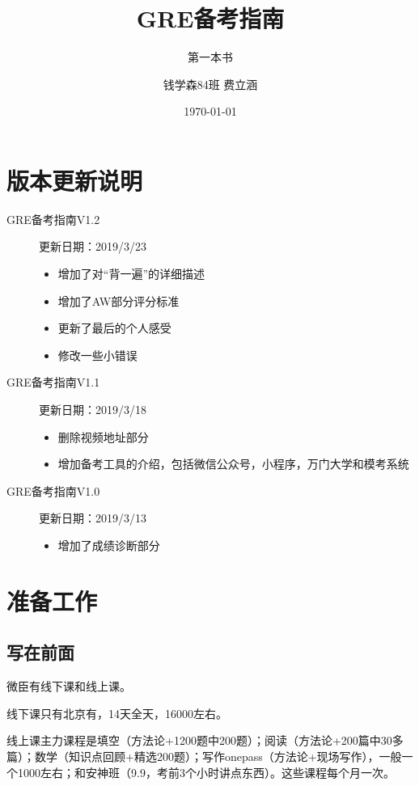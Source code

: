 \documentclass[cn,plain]{./src/qyxfbook}
\title{GRE备考指南}
\subtitle{第一本书}
\author{钱学森84班 费立涵}
\institute{钱学森学院学业辅导中心}
\date{\today}
\begin{document}
\maketitle

\chapter*{版本更新说明}
\begin{description}
    \item[GRE备考指南V1.2] 更新日期：2019/3/23
    \begin{itemize}
        \item 增加了对``背一遍''的详细描述
        \item 增加了AW部分评分标准
        \item 更新了最后的个人感受
        \item 修改一些小错误
    \end{itemize}
    \item[GRE备考指南V1.1] 更新日期：2019/3/18
    \begin{itemize}
        \item 删除视频地址部分
        \item 增加备考工具的介绍，包括微信公众号，小程序，万门大学和模考系统
    \end{itemize}
    \item[GRE备考指南V1.0] 更新日期：2019/3/13
    \begin{itemize}
        \item 增加了成绩诊断部分
    \end{itemize}
\end{description}
\newpage
\thispagestyle{empty}

\tableofcontents

\hypersetup{pageanchor=true}

\chapter{准备工作}
\section{写在前面}
微臣有线下课和线上课。

线下课只有北京有，14天全天，16000左右。

线上课主力课程是填空（方法论+1200题中200题）；阅读（方法论+200篇中30多篇）；数学（知识点回顾+精选200题）；写作onepass（方法论+现场写作），一般一个1000左右；和安神班（9.9，考前3个小时讲点东西）。这些课程每个月一次。
\end{document}
